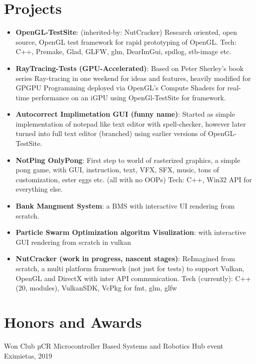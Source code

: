 \documentclass[a4paper,20pt]{article}
\newcommand{\resumeItem}[2]{
  \item\small{
    \textbf{#1}{: #2 \vspace{-2pt}}
  }
}
\newcommand{\resumeSubItem}[2]{\resumeItem{#1}{#2}\vspace{-3pt}}
\newcommand{\resumeSubHeadingListStart}{\begin{itemize}[leftmargin=*]}
\newcommand{\resumeSubHeadingListEnd}{\end{itemize}}
\begin{document}
\section{Projects}
  \resumeSubHeadingListStart
    \resumeSubItem{OpenGL-TestSite}{(inherited-by: NutCracker) Research oriented, open source, OpenGL test framework for rapid prototyping of OpenGL. Tech: C++, Premake, Glad, GLFW, glm, DearImGui, spdlog, stb-image etc. }\hspace{26pt}{(May-Oct '21)}
    \vspace{2pt}
    \resumeSubItem{RayTracing-Tests (GPU-Accelerated)}{Based on Peter Sherley’s book series Ray-tracing in one weekend for ideas and features, heavily modified for GPGPU Programming deployed via OpenGL's Compute Shaders for real-time performance on an iGPU using OpenGl-TestSite for framework.}\hspace{265pt}{(Jun-Aug '21)}
    \vspace{2pt}
    \resumeSubItem{Autocorrect Implimetation GUI (funny name)}{Started as simple implementation of notepad like text editor with spell-checker, however later turned into full text editor (branched) using earlier versions of OpenGL-TestSite.}{(May-Aug '21)}
    \vspace{2pt}
    \resumeSubItem{NotPing OnlyPong}{First step to world of rasterized graphics, a simple pong game, with GUI, instruction, text, VFX, SFX, music, tons of customization, ester eggs etc. (all with no OOPs) Tech: C++, Win32 API for everything else.}\hspace{20pt}{(May '20)}
    \vspace{2pt}
    \resumeSubItem{Bank Mangment System}{a BMS with interactive UI rendering from scratch.}\hspace{134pt}{(May '20)}
    \vspace{2pt}
    \resumeSubItem{Particle Swarm Optimization algoritm Visulization}{with interactive GUI rendering from scratch in vulkan}
    \hspace{5pt}{(May '22)}
    \vspace{2pt}
    \resumeSubItem{NutCracker (work in progress, nascent stages)}{ReImagined from scratch, a multi platform framework (not just for tests) to support Vulkan, OpenGL and DirectX with inter API communication. Tech (currently): C++(20, modules), VulkanSDK, VcPkg for fmt, glm, glfw }\hspace{280pt}{(May-present '22)}
  \resumeSubHeadingListEnd
\vspace{-5pt}
\section{Honors and Awards}
\begin{description}[font=$\bullet$]
\item {Won Club µCR Microcontroller Based Systems and Robotics Hub event Eximietas, 2019 }
\end{description}
\vspace{-5pt}
\end{document}
